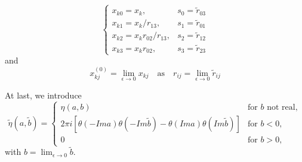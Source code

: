 \begin{equation}
\begin{cases}
x_{k0}=x_k,  &s_0=\tilde{r}_{03}\\
x_{k1}=x_k/r_{13},  &s_1=\tilde{r}_{01}\\
x_{k2}=x_kr_{02}/r_{13},  &s_2=\tilde{r}_{12}\\
x_{k3}=x_kr_{02},   &s_3=\tilde{r}_{23}
\end{cases}
\end{equation}
and
\begin{equation}
x^{(0)}_{kj}=\lim_{\epsilon\to 0}x_{kj}\quad\text{as}\quad r_{ij}=\lim_{\epsilon\to 0}\widetilde{r}_{ij}
\end{equation}

At last, we introduce
\begin{equation}
\widetilde{\eta}(a,\widetilde{b})
=\begin{cases}
\eta(a,b) & \text{for $b$ not real},\\
2\pi i[\theta(-Ima)\theta(-Im\widetilde{b})-\theta(Ima)\theta(Im\widetilde{b})]& \text{for $b<0$},\\
0 &\text{for $b>0$},
\end{cases}
\end{equation}
with $b=\lim_{\epsilon\to 0}\widetilde{b}$.

